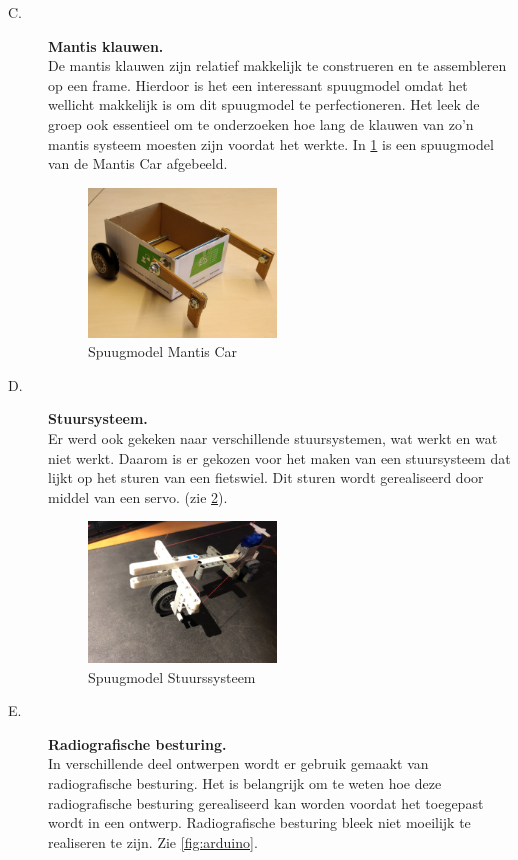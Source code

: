\begin{description}
\item[C.] {\bf Mantis klauwen.}\\
De mantis klauwen zijn relatief makkelijk te construeren en te assembleren op een frame. Hierdoor is het een interessant spuugmodel omdat het wellicht makkelijk is om dit spuugmodel te perfectioneren. Het leek de groep ook essentieel om te onderzoeken hoe lang de klauwen van zo'n mantis systeem moesten zijn voordat het werkte. In \cref{fig:Mantis_spuug} is een spuugmodel van de Mantis Car afgebeeld. \\

\begin{figure}[H]
\centering
    \includegraphics[width = 50mm]{04_idee_ontwikkeling/Mantis_spuugmodel.jpg}
    \caption{Spuugmodel Mantis Car}
    \label{fig:Mantis_spuug}
\end{figure} 

\item[D.] {\bf Stuursysteem.}\\
Er werd ook gekeken naar verschillende stuursystemen, wat werkt en wat niet werkt. Daarom is er gekozen voor het maken van een stuursysteem dat lijkt op het sturen van een fietswiel. Dit sturen wordt gerealiseerd door middel van een servo. (zie \cref{fig:Fietsstuur}). \\

\begin{figure}[H]
    \centering
    \includegraphics[width = 50mm]{04_idee_ontwikkeling/fietsstuur.jpg}
    \caption{Spuugmodel Stuurssysteem}
    \label{fig:Fietsstuur}
\end{figure} 



\item[E.] {\bf Radiografische besturing.}\\
In verschillende deel ontwerpen wordt er gebruik gemaakt van radiografische besturing. Het is belangrijk om te weten hoe deze radiografische besturing gerealiseerd kan worden voordat het toegepast wordt in een ontwerp. Radiografische besturing bleek niet moeilijk te realiseren te zijn. Zie \cref{fig:arduino}.



\end{description}
